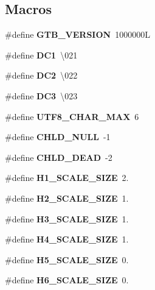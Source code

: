 \subsection*{Macros}
\begin{DoxyCompactItemize}
\item 
\mbox{\label{a00005_ac48c337ccf15cdab391eaae729902b5e}} 
\#define {\bfseries G\+T\+B\+\_\+\+V\+E\+R\+S\+I\+ON}~1000000L
\item 
\mbox{\label{a00005_a6a761932477b582680bf7fed666c6e61}} 
\#define {\bfseries D\+C1}~\textquotesingle{}\textbackslash{}021\textquotesingle{}
\item 
\mbox{\label{a00005_a97a74d0dbbdcf880ce8bc1c375c84c32}} 
\#define {\bfseries D\+C2}~\textquotesingle{}\textbackslash{}022\textquotesingle{}
\item 
\mbox{\label{a00005_a4877b26a0217c0449768036b0498e78a}} 
\#define {\bfseries D\+C3}~\textquotesingle{}\textbackslash{}023\textquotesingle{}
\item 
\mbox{\label{a00005_a3fba98e4f2b44f2762e20abb6578e0d2}} 
\#define {\bfseries U\+T\+F8\+\_\+\+C\+H\+A\+R\+\_\+\+M\+AX}~6
\item 
\mbox{\label{a00005_a1ac5b819ce482eb4a63e85c3671dd303}} 
\#define {\bfseries C\+H\+L\+D\+\_\+\+N\+U\+LL}~-\/1
\item 
\mbox{\label{a00005_a33309af6aac10118c1d94f9757602a9b}} 
\#define {\bfseries C\+H\+L\+D\+\_\+\+D\+E\+AD}~-\/2
\item 
\mbox{\label{a00005_a7609549a7df0b2ceee442e50a63dc061}} 
\#define {\bfseries H1\+\_\+\+S\+C\+A\+L\+E\+\_\+\+S\+I\+ZE}~2.
\item 
\mbox{\label{a00005_a6d081c052149a4cb72ba8696174dd6d5}} 
\#define {\bfseries H2\+\_\+\+S\+C\+A\+L\+E\+\_\+\+S\+I\+ZE}~1.
\item 
\mbox{\label{a00005_a049f0dd6767e38e4224ca6918ad5b328}} 
\#define {\bfseries H3\+\_\+\+S\+C\+A\+L\+E\+\_\+\+S\+I\+ZE}~1.
\item 
\mbox{\label{a00005_aacd6df83c09dfc4d0c289240f32b2f94}} 
\#define {\bfseries H4\+\_\+\+S\+C\+A\+L\+E\+\_\+\+S\+I\+ZE}~1.
\item 
\mbox{\label{a00005_aef63dd05d733d24ce42cdff56955d1fb}} 
\#define {\bfseries H5\+\_\+\+S\+C\+A\+L\+E\+\_\+\+S\+I\+ZE}~0.
\item 
\mbox{\label{a00005_ab8d816268208458f38fec00022277704}} 
\#define {\bfseries H6\+\_\+\+S\+C\+A\+L\+E\+\_\+\+S\+I\+ZE}~0.
\end{DoxyCompactItemize}
